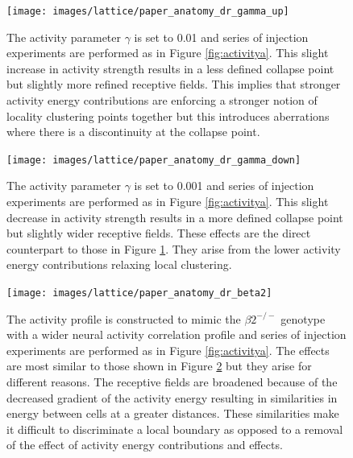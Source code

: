 \begin{landscape}
	\begin{figure}
		\centering
		\texttt{[image: images/lattice/paper\_anatomy\_dr\_gamma\_up]}
		\captionsetup{width=.75\linewidth}
		\def\c{The activity parameter $\gamma$ is set to 0.01 and series of injection experiments are performed as in Figure \ref{fig:activitya}. This slight increase in activity strength results in a less defined collapse point but slightly more refined receptive fields. }
		\caption[\c]{\c This implies that stronger activity energy contributions are enforcing a stronger notion of locality clustering points together but this introduces aberrations where there is a discontinuity at the collapse point.\label{fig:activityc}}
	\end{figure}
\end{landscape}

\begin{landscape}
	\begin{figure}
		\centering
		\texttt{[image: images/lattice/paper\_anatomy\_dr\_gamma\_down]}
		\captionsetup{width=.75\linewidth}
		\def\c{The activity parameter $\gamma$ is set to 0.001 and series of injection experiments are performed as in Figure \ref{fig:activitya}. This slight decrease in activity strength results in a more defined collapse point but slightly wider receptive fields. }
		\caption[\c]{\c These effects are the direct counterpart to those in Figure \ref{fig:activityc}. They arise from the lower activity energy contributions relaxing local clustering. \label{fig:activityd}}
	\end{figure}
\end{landscape}

\begin{landscape}
	\begin{figure}
		\centering
		\texttt{[image: images/lattice/paper\_anatomy\_dr\_beta2]}
		\captionsetup{width=.75\linewidth}
		\def\c{The activity profile is constructed to mimic the $\beta2^{-/-}$ genotype with a wider neural activity correlation profile and series of injection experiments are performed as in Figure \ref{fig:activitya}. }
		\caption[\c]{\c The effects are most similar to those shown in Figure \ref{fig:activityd} but they arise for different reasons. The receptive fields are broadened because of the decreased gradient of the activity energy resulting in similarities in energy between cells at a greater distances. These similarities make it difficult to discriminate a local boundary as opposed to a removal of the effect of activity energy contributions and effects.  \label{fig:activitye}}
	\end{figure}
\end{landscape}

